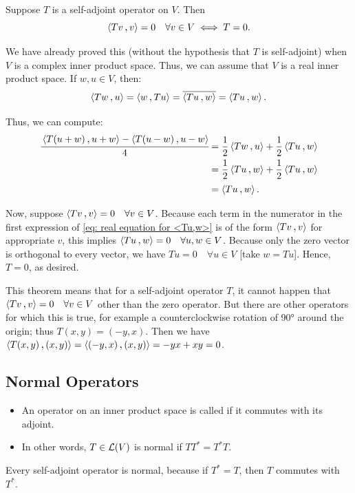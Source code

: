 \begin{thm}
   \label{thm: T self-adjoint and <Tv,v>=0 for all v <=> T=0}
   Suppose $T$ is a self-adjoint operator on $V$. Then
   \[
     \ip{Tv}{v} = 0 \quad \forall v \in V \iff T = 0.
   \]
\end{thm}
\begin{prf}
  We have already proved this (without the hypothesis that $T$ is self-adjoint) when $V$ is a complex inner product space. Thus, we can assume that $V$ is a real inner product space. If $w,u \in V$, then:
  \[
  \ip{Tw}{u} = \ip{w}{Tu} = \overline{\ip{Tu}{w}} = \ip{Tu}{w}.
  \]

  Thus, we can compute:
  \begin{equation}
      \label{eq: real equation for <Tu,w>}
    \begin{aligned}
    \cfrac{\ip{T(u+w)}{u+w} - \ip{T(u-w)}{u-w}}{4}
    &= \frac{1}{2} \ip{Tw}{u} + \frac{1}{2} \ip{Tu}{w} \\
    &= \frac{1}{2} \ip{Tu}{w} + \frac{1}{2} \ip{Tu}{w} \\
    &= \ip{Tu}{w}.
    \end{aligned}
  \end{equation}


  Now, suppose $\ip{Tv}{v} = 0 \quad \forall v \in V$. Because each term in the numerator in the first expression of \eqref{eq: real equation for <Tu,w>} is of the form $\ip{Tv}{v}$ for appropriate $v$, this implies $\ip{Tu}{w} = 0 \quad \forall u,w \in V$. Because only the zero vector is orthogonal to every vector, we have $Tu=0 \quad \forall u \in V$ [take $w=Tu$]. Hence, $T=0$, as desired.
\end{prf}

This theorem means that for a self-adjoint operator $T$, it cannot happen that $\ip{Tv}{v} = 0 \quad \forall v \in V$ other than the zero operator. But there are other operators for which this is true, for example a counterclockwise rotation of 90° around the origin; thus $T(x,y) = (-y,x)$. Then we have $\ip{T(x,y)}{(x,y)} = \ip{(-y,x)}{(x,y)}=-yx+xy=0$.

\subsection{Normal Operators}

\begin{mydef}[normal]
  \begin{itemize}
  \item An operator on an inner product space is called  if it commutes with its adjoint.

  \item In other words, $T \in \mathcal{L} (V)$ is normal if $TT^* = T^* T.$

  \end{itemize}
Every self-adjoint operator is normal, because if $T^* = T$, then $T$ commutes with $T^*$.
\end{mydef}

